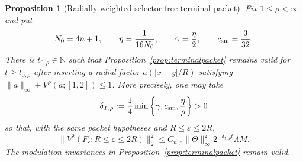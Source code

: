 \documentclass[11pt]{article}
\numberwithin{equation}{section}
\newtheorem{proposition}[theorem]{Proposition}
\theoremstyle{remark}
\theoremstyle{definition}
\begin{document}
\begin{proposition}[Radially weighted selector-free terminal packet]
\label{prop:allq-terminal-packet}
Fix $1\le\rho<\infty$ and put
\begin{equation}\label{eq:allq-terminal-parameters}
 N_0=4n+1,
 \qquad \eta=\frac1{16N_0},
 \qquad \gamma=\frac\eta2,
 \qquad c_{\rm sm}=\frac3{32}.
\end{equation}
There is $t_{0,\rho}\in\mathbb N$ such that
Proposition~\ref{prop:terminalpacket} remains valid for $t\ge t_{0,\rho}$
after inserting a radial factor $a(|x-y|/R)$ satisfying
$\|a\|_\infty+V^\rho(a;[1,2])\le1$. More precisely, one may take
\begin{equation}\label{eq:allq-terminal-explicit-decay}
 \delta_{T,\rho}
 :=\frac14\min\left\{\gamma,c_{\rm sm},\frac\eta\rho\right\}>0
\end{equation}
so that, with the same packet hypotheses and $R\le\varepsilon\le2R$,
\begin{equation}\label{eq:allq-terminal-packet}
 \|V^2(F_\varepsilon:R\le\varepsilon\le2R)\|_2^2
 \le C_{n,\rho}\|\Theta\|_\infty^2
 2^{-\delta_{T,\rho}t}\Lambda M.
\end{equation}
The modulation invariances in Proposition~\ref{prop:terminalpacket}
remain valid.
\end{proposition}
\end{document}
